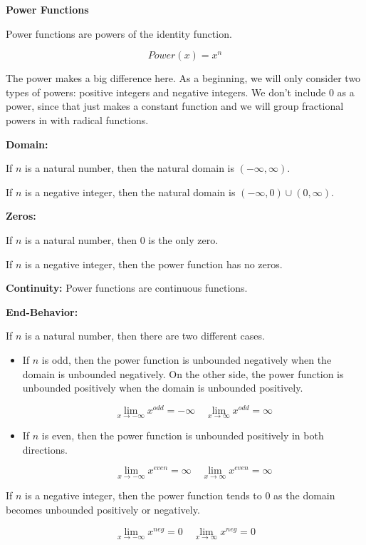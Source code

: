 \documentclass{ximera}
\begin{document}
\begin{explanation} \textbf{\textcolor{red!75!green}{Power Functions}} 


Power functions are powers of the identity function.


\[ Power(x) = x^n  \]

The power makes a big difference here.  As a beginning, we will only consider two types of powers: positive integers and negative integers. We don't include $0$ as a power, since that just makes a constant function and we will group fractional powers in with radical functions. 

\textbf{Domain:} 

If $n$ is a natural number, then the natural domain is $(-\infty, \infty)$.

If $n$ is a negative integer, then the natural domain is $(-\infty, 0) \cup (0, \infty)$.


\textbf{Zeros:} 

If $n$ is a natural number, then $0$ is the only zero.

If $n$ is a negative integer, then the power function has no zeros.


\textbf{Continuity:} Power functions are continuous functions.

\textbf{End-Behavior:} 

If $n$ is a natural number, then there are two different cases.

\begin{itemize}
\item If $n$ is odd, then the power function is unbounded negatively when the domain is unbounded negatively. On the other side, the power function is unbounded positively when the domain is unbounded positively.


\[
\lim\limits_{x \to -\infty} x^{odd} = -\infty   \, \text{   } \, \lim\limits_{x \to \infty} x^{odd} = \infty
\]

\item If $n$ is even, then the power function is unbounded positively in both directions.

\[
\lim\limits_{x \to -\infty} x^{even} = \infty   \, \text{   } \, \lim\limits_{x \to \infty} x^{even} = \infty
\]

\end{itemize}

If $n$ is a negative integer, then the power function tends to $0$ as the domain becomes unbounded positively or negatively.


\[
\lim\limits_{x \to -\infty} x^{neg} = 0   \, \text{   } \, \lim\limits_{x \to \infty} x^{neg} = 0
\]






\end{explanation}
\end{document}
